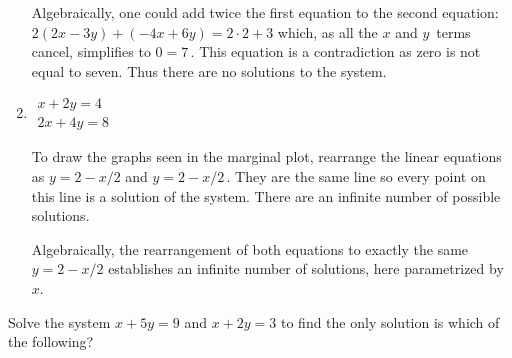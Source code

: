 \begin{example}
\begin{enumerate}[ref=\ref{eg:2eqs2vars}(\alph*)]
\begin{solution}
Algebraically, one could add twice the first equation to the second equation: \(2(2x-3y)+(-4x+6y)=2\cdot2+3\) which, as all the \(x\) and \(y\)~terms cancel, simplifies to \(0=7\)\,. 
This equation is a contradiction as zero is not equal to seven.  
Thus there are no solutions to the system.
\end{solution}

\item \(\begin{array}{l} x+2y=4\\2x+4y=8 \end{array}\)
\begin{solution} 
To draw the graphs seen in the marginal plot, rearrange  the linear equations as \(y=2-x/2\) and \(y=2-x/2\)\,.  
%
They are the same line so every point on this line is a solution of the system.  
There are an infinite number of possible solutions.


Algebraically, the rearrangement of both equations to exactly the same \(y=2-x/2\) establishes an infinite number of solutions, here parametrized by~\(x\).
\end{solution}

\end{enumerate}
\end{example}




\begin{activity}
Solve the system \(x+5y=9\) and \(x+2y=3\) to find the only solution is which of the following?
\end{activity}





